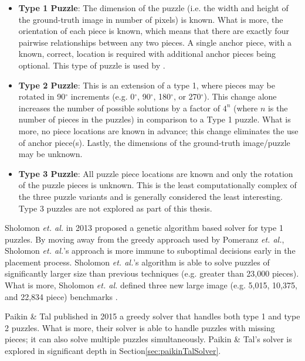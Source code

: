 \documentclass{report}
\newcommand{\numbwithdegreesymbol}[1]{#1$^\circ$}
\begin{document}
\begin{itemize}

	\item \textbf{Type 1 Puzzle}: The dimension of the puzzle (i.e. the width and height of the ground-truth image in number of pixels) is known.  What is more, the orientation of each piece is known, which means that there are exactly four pairwise relationships between any two pieces.  A single anchor piece, with a known, correct, location is required with additional anchor pieces being optional.  This type of puzzle is used by \cite{cho2010, pomeranz2011}.
	
	\item \textbf{Type 2 Puzzle}: This is an extension of a type 1, where pieces may be rotated in \numbwithdegreesymbol{90} increments (e.g. \numbwithdegreesymbol{0}, \numbwithdegreesymbol{90}, \numbwithdegreesymbol{180}, or \numbwithdegreesymbol{270}).  This change alone increases the number of possible solutions by a factor of $4^n$ (where $n$ is the number of pieces in the puzzles) in comparison to a Type 1 puzzle.  What is more, no piece locations are known in advance; this change eliminates the use of anchor piece(s).  Lastly, the dimensions of the ground-truth image/puzzle may be unknown.
	
	\item \textbf{Type 3 Puzzle}: All puzzle piece locations are known and only the rotation of the puzzle pieces is unknown.  This is the least computationally complex of the three puzzle variants and is generally considered the least interesting.  Type 3 puzzles are not explored as part of this thesis.

\end{itemize}

Sholomon \textit{et. al.} \cite{sholomon2013} in 2013 proposed a genetic algorithm based solver for type 1 puzzles.  By moving away from the greedy approach used by Pomeranz \textit{et. al.}, Sholomon \textit{et. al.}'s approach is more immune to suboptimal decisions early in the placement process. Sholomon \textit{et. al.}'s algorithm is able to solve puzzles of significantly larger size than previous techniques (e.g. greater than 23,000 pieces).  What is more, Sholomon \textit{et. al.} defined three new large image (e.g. 5,015, 10,375, and 22,834 piece) benchmarks \cite{sholomonBenchmarkImages}.

Paikin \& Tal \cite{paikin2015} published in 2015 a greedy solver that handles both type 1 and type 2 puzzles.  What is more, their solver is able to handle puzzles with missing pieces; it can also solve multiple puzzles simultaneously.  Paikin \& Tal's solver is explored in significant depth in Section\ref{sec:paikinTalSolver}.
\end{document}
